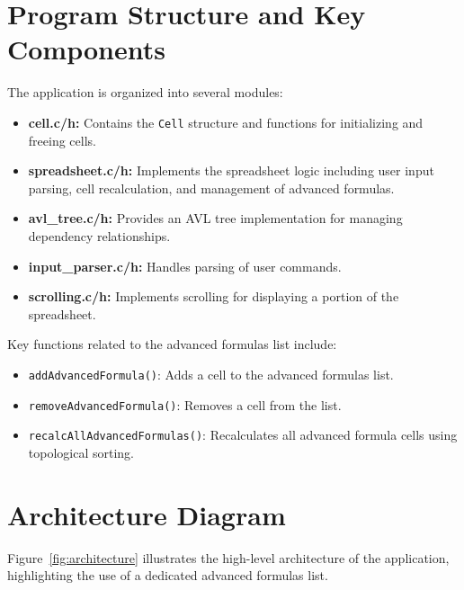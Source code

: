 \documentclass[12pt]{article}
\begin{document}
\section{Program Structure and Key Components}
The application is organized into several modules:
\begin{itemize}[noitemsep]
    \item \textbf{cell.c/h:} Contains the \texttt{Cell} structure and functions for initializing and freeing cells.
    \item \textbf{spreadsheet.c/h:} Implements the spreadsheet logic including user input parsing, cell recalculation, and management of advanced formulas.
    \item \textbf{avl\_tree.c/h:} Provides an AVL tree implementation for managing dependency relationships.
    \item \textbf{input\_parser.c/h:} Handles parsing of user commands.
    \item \textbf{scrolling.c/h:} Implements scrolling for displaying a portion of the spreadsheet.
\end{itemize}

Key functions related to the advanced formulas list include:
\begin{itemize}[noitemsep]
    \item \texttt{addAdvancedFormula()}: Adds a cell to the advanced formulas list.
    \item \texttt{removeAdvancedFormula()}: Removes a cell from the list.
    \item \texttt{recalcAllAdvancedFormulas()}: Recalculates all advanced formula cells using topological sorting.
\end{itemize}

\section{Architecture Diagram}
Figure~\ref{fig:architecture} illustrates the high-level architecture of the application, highlighting the use of a dedicated advanced formulas list.
\end{document}

